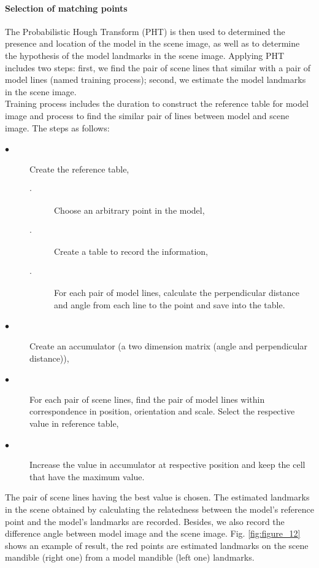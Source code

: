\documentclass[twoside,twocolumn,10pt]{article}
\begin{document}
\paragraph{Selection of matching points}
The Probabilistic Hough Transform (PHT) is then used to determined the presence and location of the
model in the scene image, as well as to determine the hypothesis of
the model landmarks in the scene
image\cite{ashbrook1995robust}. Applying PHT includes two steps:
first, we find the pair of scene lines that similar with a pair of
model lines (named training process); second, we estimate the model landmarks in the scene image.\\[0.2cm]
Training process includes the duration to construct the reference table for model image and process to find the similar pair of lines between model and scene image. The steps as follows:
\small{
\begin{description}
	\item[$\bullet$] Create the reference table,
		\begin{description}
			\item[$\cdot$] Choose an arbitrary point in the model,
			\item[$\cdot$] Create a table to record the information,
			\item[$\cdot$] For each pair of model lines, calculate the perpendicular distance and angle from each line to the point and save into the table.
		\end{description}
	\item[$\bullet$] Create an accumulator (a two dimension matrix (angle and perpendicular distance)),
	\item[$\bullet$] For each pair of scene lines, find the pair of model lines within correspondence in position, orientation and scale. Select the respective value in reference table,
	\item[$\bullet$] Increase the value in accumulator at respective position and keep the cell that have the maximum value.
\end{description}
}
The pair of scene lines having the best value is chosen. The estimated
landmarks in the scene obtained by calculating the relatedness between
the model's reference point and the model's landmarks are
recorded. Besides, we also record the difference angle between model
image and the scene image. Fig. \ref{fig:figure_12} shows an example
of result, the red points are estimated landmarks on the scene mandible
(right one) from a model mandible (left one) landmarks. 
\end{document}
